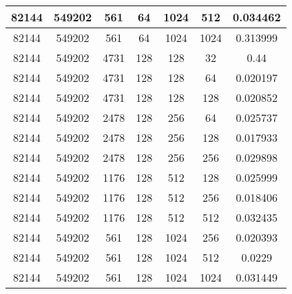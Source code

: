 \documentclass[9pt]{article}
\begin{document}
\begin{tabular}{|c|c|c|c|c|c|c| }
\hline
82144  & 549202  & 561  & 64  & 1024  & 512  & 0.034462 \\
\hline
82144  & 549202  & 561  & 64  & 1024  & 1024  & 0.313999 \\
\hline
82144  & 549202  & 4731  & 128  & 128  & 32  & 0.44 \\
\hline
82144  & 549202  & 4731  & 128  & 128  & 64  & 0.020197 \\
\hline
82144  & 549202  & 4731  & 128  & 128  & 128  & 0.020852 \\
\hline
82144  & 549202  & 2478  & 128  & 256  & 64  & 0.025737 \\
\hline
82144  & 549202  & 2478  & 128  & 256  & 128  & 0.017933 \\
\hline
82144  & 549202  & 2478  & 128  & 256  & 256  & 0.029898 \\
\hline
82144  & 549202  & 1176  & 128  & 512  & 128  & 0.025999 \\
\hline
82144  & 549202  & 1176  & 128  & 512  & 256  & 0.018406 \\
\hline
82144  & 549202  & 1176  & 128  & 512  & 512  & 0.032435 \\
\hline
82144  & 549202  & 561  & 128  & 1024  & 256  & 0.020393 \\
\hline
82144  & 549202  & 561  & 128  & 1024  & 512  & 0.0229 \\
\hline
82144  & 549202  & 561  & 128  & 1024  & 1024  & 0.031449 \\
\hline
\end{tabular}
 
\end{document}
